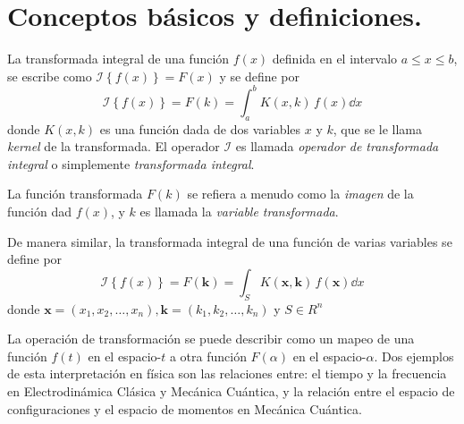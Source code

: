 \section{Conceptos básicos y definiciones.}
La transformada integral de una función $f(x)$ definida en el intervalo $a \leq x \leq b$, se escribe como $\mathscr{I} \left\{ f(x) \right\} = F(x)$ y se define por
\begin{equation}
\mathscr{I} \left\{ f(x) \right\} = F(k) = \int_{a}^{b} K(x, k) \, f(x) \dd{x}
\label{eq:ecuacion_01_02_01}
\end{equation}
donde $K(x, k)$ es una función dada de dos variables $x$ y $k$, que se le llama \emph{kernel} de la transformada. El operador $\mathscr{I}$ es llamada \emph{operador de transformada integral} o simplemente \emph{transformada integral}.
\par
La función transformada $F(k)$ se refiera a menudo como la \emph{imagen} de la función dad $f(x)$, y $k$ es llamada la \emph{variable transformada}.
\par
De manera similar, la transformada integral de una función de varias variables se define por
\begin{equation}
\mathscr{I} \left\{ f(x) \right\} = F(\mathbf{k}) = \int_{S} K(\mathbf{x}, \mathbf{k}) \, f(\mathbf{x}) \dd{x}
\label{eq:ecuacion_01_02_02}
\end{equation}
donde $\mathbf{x} = (x_{1}, x_{2}, \ldots, x_{n}), \mathbf{k} = (k_{1}, k_{2}, \ldots, k_{n})$ y $S \in R^{n}$
\par
La operación de transformación se puede describir como un mapeo de una función $f(t)$ en el espacio-$t$ a otra función $F (\alpha)$ en el espacio-$\alpha$. Dos ejemplos de esta interpretación en física son las relaciones entre: el tiempo y la frecuencia en Electrodinámica Clásica y Mecánica Cuántica, y la relación entre el espacio de configuraciones y el espacio de momentos en Mecánica Cuántica.

